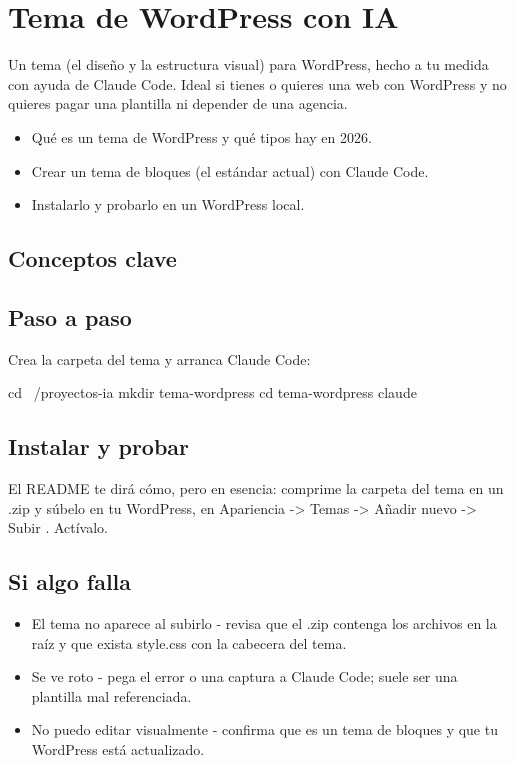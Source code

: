 \documentclass[11pt,a4paper]{book}
\begin{document}
\chapter{Tema de WordPress con IA}
Un tema (el diseño y la estructura visual) para WordPress, hecho a tu medida con ayuda de Claude Code. Ideal si tienes o quieres una web con WordPress y no quieres pagar una plantilla ni depender de una agencia.

\begin{itemize}\item Qué es un tema de WordPress y qué tipos hay en 2026.\end{itemize}
\begin{itemize}\item Crear un tema de bloques (el estándar actual) con Claude Code.\end{itemize}
\begin{itemize}\item Instalarlo y probarlo en un WordPress local.\end{itemize}
\section{Conceptos clave}
\section{Paso a paso}
Crea la carpeta del tema y arranca Claude Code:

\begin{codebox}
cd ~/proyectos-ia
mkdir tema-wordpress
cd tema-wordpress
claude
\end{codebox}
\section{Instalar y probar}
El README te dirá cómo, pero en esencia: comprime la carpeta del tema en un .zip y súbelo en tu WordPress, en Apariencia -> Temas -> Añadir nuevo -> Subir . Actívalo.

\section{Si algo falla}
\begin{itemize}\item El tema no aparece al subirlo - revisa que el .zip contenga los archivos en la raíz y que exista style.css con la cabecera del tema.\end{itemize}
\begin{itemize}\item Se ve roto - pega el error o una captura a Claude Code; suele ser una plantilla mal referenciada.\end{itemize}
\begin{itemize}\item No puedo editar visualmente - confirma que es un tema de bloques y que tu WordPress está actualizado.\end{itemize}
\end{document}
